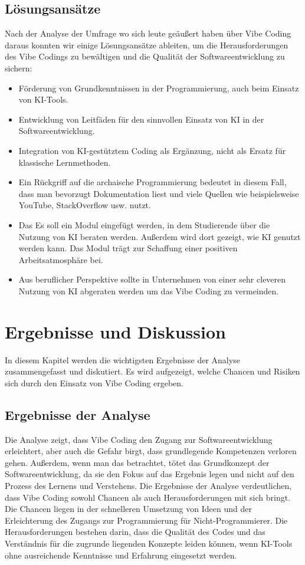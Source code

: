 \documentclass[paper=a4,fontsize=12pt,ngerman]{scrartcl}
\begin{document}
\subsection{Lösungsansätze}
Nach der Analyse der Umfrage wo sich leute geäußert haben über Vibe Coding daraus konnten wir einige Lösungsansätze ableiten, um die Herausforderungen des Vibe Codings zu bewältigen und die Qualität der Softwareentwicklung zu sichern:
\begin{itemize}
    \item Förderung von Grundkenntnissen in der Programmierung, auch beim Einsatz von KI-Tools.
    \item Entwicklung von Leitfäden für den sinnvollen Einsatz von KI in der Softwareentwicklung.
    \item Integration von KI-gestütztem Coding als Ergänzung, nicht als Ersatz für klassische Lernmethoden.
    \item Ein Rückgriff auf die archaische Programmierung bedeutet in diesem Fall, dass man bevorzugt Dokumentation liest und viele Quellen wie beispielsweise YouTube, StackOverflow usw. nutzt.
    \item Das Es soll ein Modul eingefügt werden, in dem Studierende über die Nutzung von KI beraten werden. Außerdem wird dort gezeigt, wie KI genutzt werden kann. Das Modul trägt zur Schaffung einer positiven Arbeitsatmosphäre bei.
    \item Aus beruflicher Perspektive sollte in Unternehmen von einer sehr cleveren Nutzung von KI abgeraten werden um das Vibe Coding zu vermeinden.  
\end{itemize}

\clearpage
\section{Ergebnisse und Diskussion}
In diesem Kapitel werden die wichtigsten Ergebnisse der Analyse zusammengefasst und diskutiert. Es wird aufgezeigt, welche Chancen und Risiken sich durch den Einsatz von Vibe Coding ergeben.

\subsection{Ergebnisse der Analyse}
Die Analyse zeigt, dass Vibe Coding den Zugang zur Softwareentwicklung erleichtert, aber auch die Gefahr birgt, dass grundlegende Kompetenzen verloren gehen.
Außerdem, wenn man das betrachtet, tötet das Grundkonzept der Softwareentwicklung, da sie den Fokus auf das Ergebnis legen und nicht auf den Prozess des Lernens und Verstehens.
Die Ergebnisse der Analyse verdeutlichen, dass Vibe Coding sowohl Chancen als auch Herausforderungen mit sich bringt.
Die Chancen liegen in der schnelleren Umsetzung von Ideen und der Erleichterung des Zugangs zur Programmierung für Nicht-Programmierer.
Die Herausforderungen bestehen darin, dass die Qualität des Codes und das Verständnis für die zugrunde liegenden Konzepte leiden können, wenn KI-Tools ohne ausreichende Kenntnisse und Erfahrung eingesetzt werden.
\end{document}

